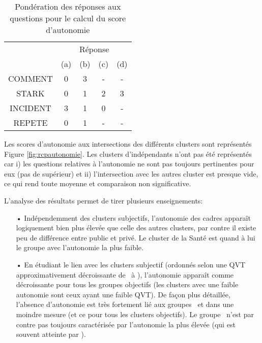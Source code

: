 \documentclass[11pt,fleqn,a4paper,openany,frenchb]{book} %
\begin{document}
\bgroup
\def\arraystretch{1.5}
\begin{table}[!h]
\centering
\begin{tabular}{|c|c|c|c|c|}
\cline{2-5}
\multicolumn{1}{c}{}&\multicolumn{4}{|c|}{Réponse}\\ \cline{2-5}
\multicolumn{1}{c}{} & \multicolumn{1}{|c}{(a)} & \multicolumn{1}{|c}{(b)} & \multicolumn{1}{|c}{(c)}  & \multicolumn{1}{|c|}{(d)} \\ \hline
COMMENT & 0 & 3 & - & - \\ 
\hline 
STARK & 0 & 1 & 2 & 3 \\
\hline
INCIDENT & 3 & 1 & 0 & - \\ 
\hline 
REPETE & 0 & 1 & - & - \\
\hline

\end{tabular}
\caption{Pondération des réponses aux questions pour le calcul du score d'autonomie}

\label{tab:autonomiescore}
\end{table}
\bgroup
\def\arraystretch{1}

Les scores d'autonomie aux intersections des différents clusters sont représentés Figure \ref{fig:rcpautonomie}. Les clusters d'indépendants n'ont pas été représentés car i) les questions relatives à l'autonomie ne sont pas toujours pertinentes pour eux (pas de supérieur) et ii) l'intersection avec les autres cluster est presque vide, ce qui rend toute moyenne et comparaison non significative.

L'analyse des résultats permet de tirer plusieurs enseignements:
    \begin{itemize}
    \item[•] Indépendemment des clusters subjectifs, l'autonomie des cadres apparaît logiquement bien plus élevée que celle des autres clusters, par contre il existe peu de différence entre public et privé. Le cluster de la Santé est quand à lui le groupe avec l'autonomie la plus faible.
    \item[•] En étudiant le lien avec les clusters subjectif (ordonnés selon une QVT approximativement décroissante de \HEUR\ à \MALH ), l'autonomie apparaît comme décroissante pour tous les groupes objectifs (les clusters avec une faible autonomie sont ceux ayant une faible QVT). De façon plus détaillée, l'absence d'autonomie est très fortement lié aux groupes \MALH\ et dans une moindre mesure \ENV (et ce pour tous les clusters objectifs). Le groupe \HEUR\ n'est par contre pas toujours caractérisée par l'autonomie la plus élevée (qui est souvent atteinte par \RAS ).  
    \end{itemize}
\end{document}
